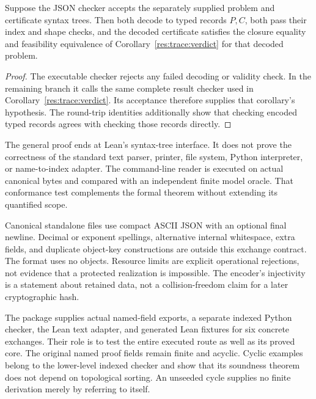 \begin{theorem}
\label{res:trace:json}
Suppose the JSON checker accepts the separately supplied problem and certificate syntax trees. Then both decode to typed records $P,C$, both pass their index and shape checks, and the decoded certificate satisfies the closure equality and feasibility equivalence of Corollary~\ref{res:trace:verdict} for that decoded problem.
\end{theorem}
\begin{proof}
The executable checker rejects any failed decoding or validity check. In the remaining branch it calls the same complete result checker used in Corollary~\ref{res:trace:verdict}. Its acceptance therefore supplies that corollary's hypothesis. The round-trip identities additionally show that checking encoded typed records agrees with checking those records directly.
\end{proof}

The general proof ends at Lean's  syntax-tree interface. It does not prove the correctness of the standard text parser, printer, file system, Python interpreter, or name-to-index adapter. The command-line reader is executed on actual canonical bytes and compared with an independent finite model oracle. That conformance test complements the formal theorem without extending its quantified scope.

Canonical standalone files use compact ASCII JSON with an optional final newline. Decimal or exponent spellings, alternative internal whitespace, extra fields, and duplicate object-key constructions are outside this exchange contract. The format uses no objects. Resource limits are explicit operational rejections, not evidence that a protected realization is impossible. The encoder's injectivity is a statement about retained data, not a collision-freedom claim for a later cryptographic hash.

The package supplies actual named-field exports, a separate indexed Python checker, the Lean text adapter, and generated Lean fixtures for six concrete exchanges. Their role is to test the entire executed route as well as its proved core. The original named proof fields remain finite and acyclic. Cyclic examples belong to the lower-level indexed checker and show that its soundness theorem does not depend on topological sorting. An unseeded cycle supplies no finite derivation merely by referring to itself.



